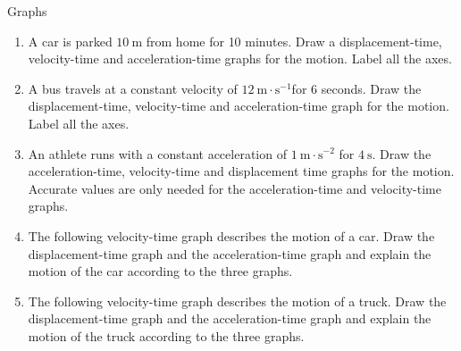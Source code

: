 \begin{exercises}{Graphs }
            \nopagebreak \noindent\vspace{-1cm}
          \label{m38795*id72955}\begin{enumerate}[noitemsep, label=\textbf{\arabic*}. ] 
            \label{m38795*uid116}\item A car is parked $10~\text{m}$ from home for 10 minutes. Draw a displacement-time, velocity-time and acceleration-time graphs for the motion. Label all the axes.\newline
\label{m38795*uid117}\item A bus travels at a constant velocity of $12~\text{m}\ensuremath{\cdot}\text{s}{}^{-1}$for 6 seconds. Draw the displacement-time, velocity-time and acceleration-time graph for the motion. Label all the axes.\newline
\label{m38795*uid118}\item An athlete runs with a constant acceleration of $1~\text{m}\ensuremath{\cdot}\text{s}{}^{-2}$ for $4~\text{s}$. Draw the acceleration-time, velocity-time and displacement time graphs for the motion. Accurate values are only needed for the acceleration-time and velocity-time graphs.\newline
\label{m38795*uid119}\item The following velocity-time graph describes the motion of a car. Draw the displacement-time graph and the acceleration-time graph and explain the motion of the car according to the three graphs.
\begin{figure}[H] %
\begin{center}
\end{center}

\end{figure}   
\label{m38795*uid120}\item The following velocity-time graph describes the motion of a truck. Draw the displacement-time graph and the acceleration-time graph and explain the motion of the truck according to the three graphs.
\begin{figure}[H] %
\begin{center}
\end{center}
 \end{figure}               \end{enumerate}


\end{exercises}
